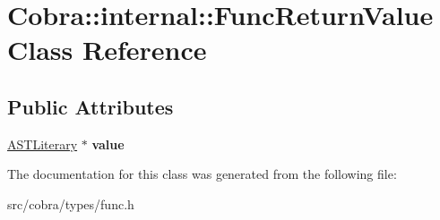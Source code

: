 \hypertarget{class_cobra_1_1internal_1_1_func_return_value}{\section{Cobra\+:\+:internal\+:\+:Func\+Return\+Value Class Reference}
\label{class_cobra_1_1internal_1_1_func_return_value}
}
\subsection*{Public Attributes}
\begin{DoxyCompactItemize}
\item 
\hypertarget{class_cobra_1_1internal_1_1_func_return_value_a7ee10eb2e7b7e3cf1786b54f8e517fda}{\hyperlink{class_cobra_1_1internal_1_1_a_s_t_literary}{A\+S\+T\+Literary} $\ast$ {\bfseries value}}\label{class_cobra_1_1internal_1_1_func_return_value_a7ee10eb2e7b7e3cf1786b54f8e517fda}

\end{DoxyCompactItemize}


The documentation for this class was generated from the following file\+:\begin{DoxyCompactItemize}
\item 
src/cobra/types/func.\+h\end{DoxyCompactItemize}
